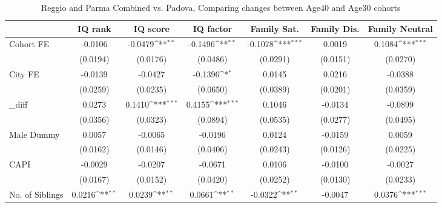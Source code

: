 \begin{table}[htbp]\centering
\def\sym#1{\ifmmode^{#1}\else\(^{#1}\)\fi}
\caption{Reggio and Parma Combined vs. Padova, Comparing changes between Age40 and Age30 cohorts}
\begin{tabular}{l*{6}{c}}
\toprule
            &\multicolumn{1}{c}{IQ rank}&\multicolumn{1}{c}{IQ score}&\multicolumn{1}{c}{IQ factor}&\multicolumn{1}{c}{Family Sat.}&\multicolumn{1}{c}{Family Dis.}&\multicolumn{1}{c}{Family Neutral}\\
\midrule
Cohort FE   &     -0.0106         &     -0.0479\sym{**} &     -0.1496\sym{**} &     -0.1078\sym{***}&      0.0019         &      0.1084\sym{***}\\
            &    (0.0194)         &    (0.0176)         &    (0.0486)         &    (0.0291)         &    (0.0151)         &    (0.0270)         \\
\addlinespace
City FE     &     -0.0139         &     -0.0427         &     -0.1396\sym{*}  &      0.0145         &      0.0216         &     -0.0388         \\
            &    (0.0259)         &    (0.0235)         &    (0.0650)         &    (0.0389)         &    (0.0201)         &    (0.0359)         \\
\addlinespace
\_diff       &      0.0273         &      0.1410\sym{***}&      0.4155\sym{***}&      0.1046         &     -0.0134         &     -0.0899         \\
            &    (0.0356)         &    (0.0323)         &    (0.0894)         &    (0.0535)         &    (0.0277)         &    (0.0495)         \\
\addlinespace
Male Dummy  &      0.0057         &     -0.0065         &     -0.0196         &      0.0124         &     -0.0159         &      0.0059         \\
            &    (0.0162)         &    (0.0146)         &    (0.0406)         &    (0.0243)         &    (0.0126)         &    (0.0225)         \\
\addlinespace
CAPI        &     -0.0029         &     -0.0207         &     -0.0671         &      0.0106         &     -0.0100         &     -0.0027         \\
            &    (0.0167)         &    (0.0152)         &    (0.0420)         &    (0.0252)         &    (0.0130)         &    (0.0233)         \\
\addlinespace
No. of Siblings&      0.0216\sym{**} &      0.0239\sym{**} &      0.0661\sym{**} &     -0.0322\sym{**} &     -0.0047         &      0.0376\sym{***}\\

\end{tabular}
\end{table}
